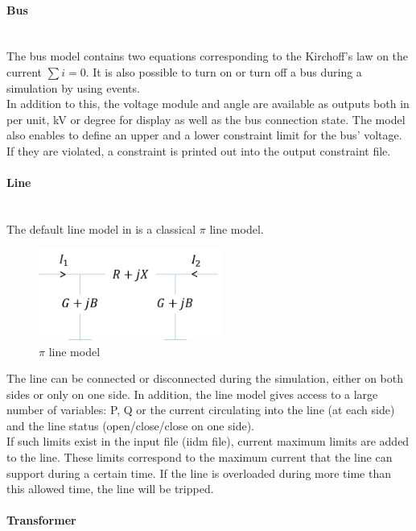 \documentclass[a4paper, 12pt]{report}
\begin{document}
\paragraph{Bus}
~~\\

The bus model contains two equations corresponding to the Kirchoff's law on the current $\sum i = 0$. It is also possible to turn on or turn off a bus during a simulation by using events. \\
In addition to this, the voltage module and angle are available as outputs both in per unit, kV or degree for display as well as the bus connection state. The model also enables to define an upper and a lower constraint limit for the bus' voltage. If they are violated, a constraint is printed out into the output constraint file. \\

\paragraph{Line}
~~\\

The default line model in \Dynawo is a classical $\pi$ line model.

\begin{figure}[h!]
\centering
\includegraphics[width=60mm]{../resources/PiLine.png}
\caption{$\pi$ line model}
\end{figure}

The line can be connected or disconnected during the simulation, either on both sides or only on one side. In addition, the line model gives access to a large number of variables: P, Q or the current circulating into the line (at each side) and the line status (open/close/close on one side). \\
If such limits exist in the input file (iidm file), current maximum limits are added to the line. These limits correspond to the maximum current that the line can support during a certain time. If the line is overloaded during more time than this allowed time, the line will be tripped. \\

\paragraph{Transformer}
~~\\
\end{document}
